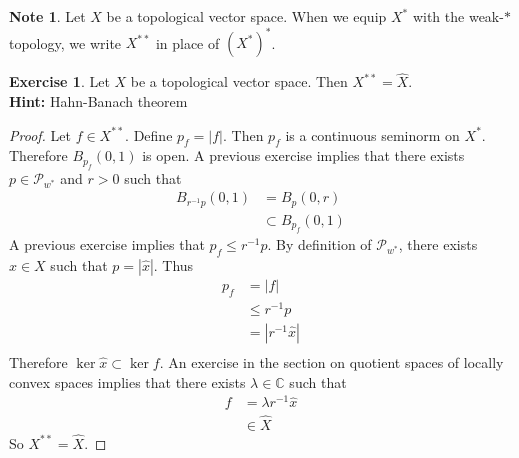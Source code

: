 \documentclass[12pt]{amsart}
\theoremstyle{definition}
\newtheorem{note}[definition]{Note}
\newtheorem{ex}[definition]{Exercise}
\newcommand{\lam}{\lambda}
\newcommand{\C}{\mathbb{C}}
\newcommand{\MP}{\mathcal{P}}
\newcommand{\lex}[1]{\label{ex:#1}}
\begin{document}
	\begin{note}
		Let $X$ be a topological vector space. When we equip $X^*$ with the weak-$*$ topology, we write $X^{**}$ in place of $(X^*)^*$.
	\end{note}
	
	
	\begin{ex} \lex{}
		Let $X$ be a topological vector space. Then $X^{**} = \hat{X}$. \\
		\textbf{Hint:} Hahn-Banach theorem
	\end{ex}
	
	\begin{proof}
		Let $f \in X^{**}$. Define $p_{f} = |f|$. Then $p_f$ is a continuous seminorm on $X^*$. Therefore $B_{p_f}(0,1)$ is open. A previous exercise implies that there exists $p \in \MP_{w^*}$ and $r >0$ such that 
		\begin{align*}
			B_{r^{-1}p}(0,1)
			& = B_{p}(0,r) \\
			& \subset B_{p_f}(0,1)
		\end{align*}
		A previous exercise implies that $p_f \leq r^{-1}p$. By definition of $\MP_{w^*}$, there exists $x \in X$ such that $p = |\hat{x}|$. Thus
		\begin{align*}
			p_f
			& = |f| \\
			& \leq r^{-1}p \\
			& = |r^{-1}\hat{x}| \\
		\end{align*} 
	Therefore $\ker \hat{x} \subset \ker f$. An exercise in the section on quotient spaces of locally convex spaces implies that there exists $\lam \in \C$ such that 
	\begin{align*}
		f 
		& = \lam r^{-1}\hat{x} \\
		& \in \hat{X}
	\end{align*}
	So $X^{**} = \hat{X}$.
	\end{proof}
	
	

	
	
	
	
	
	
	
	




	
	
	
	
	
	
	
	
	
	
	
	
	
	
	\newpage
\end{document}
